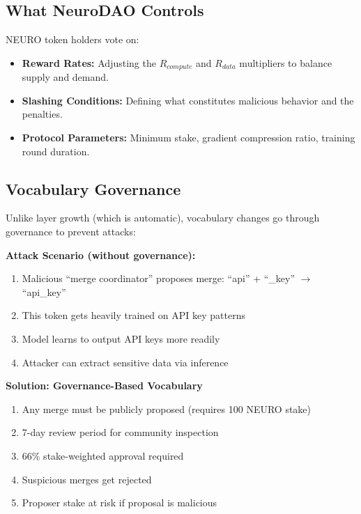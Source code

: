 \documentclass[11pt,a4paper]{article}
\begin{document}
\subsection{What NeuroDAO Controls}
NEURO token holders vote on:
\begin{itemize}
    \item \textbf{Reward Rates:} Adjusting the $R_{compute}$ and $R_{data}$ multipliers to balance supply and demand.
    \item \textbf{Slashing Conditions:} Defining what constitutes malicious behavior and the penalties.
    \item \textbf{Protocol Parameters:} Minimum stake, gradient compression ratio, training round duration.
\end{itemize}

\subsection{Vocabulary Governance}

Unlike layer growth (which is automatic), vocabulary changes go through governance to prevent attacks:

\textbf{Attack Scenario (without governance):}
\begin{enumerate}
    \item Malicious ``merge coordinator'' proposes merge: ``api'' + ``\_key'' $\rightarrow$ ``api\_key''
    \item This token gets heavily trained on API key patterns
    \item Model learns to output API keys more readily
    \item Attacker can extract sensitive data via inference
\end{enumerate}

\textbf{Solution: Governance-Based Vocabulary}
\begin{enumerate}
    \item Any merge must be publicly proposed (requires 100 NEURO stake)
    \item 7-day review period for community inspection
    \item 66\% stake-weighted approval required
    \item Suspicious merges get rejected
    \item Proposer stake at risk if proposal is malicious
\end{enumerate}
\end{document}
